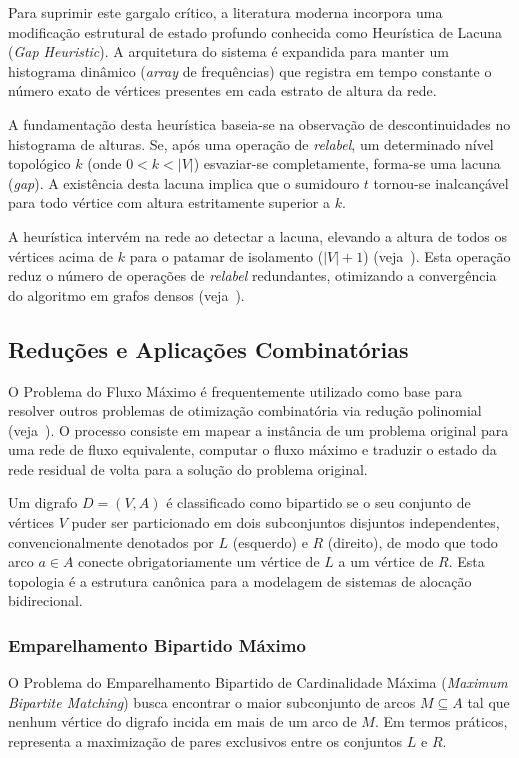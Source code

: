 \documentclass[12pt,a4paper]{article}
\begin{document}
Para suprimir este gargalo crítico, a literatura moderna incorpora uma modificação estrutural de estado profundo conhecida como Heurística de Lacuna (\textit{Gap Heuristic}). A arquitetura do sistema é expandida para manter um histograma dinâmico (\textit{array} de frequências) que registra em tempo constante o número exato de vértices presentes em cada estrato de altura da rede.

A fundamentação desta heurística baseia-se na observação de descontinuidades no histograma de alturas. Se, após uma operação de \textit{relabel}, um determinado nível topológico $k$ (onde $0 < k < |V|$) esvaziar-se completamente, forma-se uma lacuna (\textit{gap}). A existência desta lacuna implica que o sumidouro $t$ tornou-se inalcançável para todo vértice com altura estritamente superior a $k$.

A heurística intervém na rede ao detectar a lacuna, elevando a altura de todos os vértices acima de $k$ para o patamar de isolamento ($|V| + 1$) (veja~\cite{korte2018combinatorial}). Esta operação reduz o número de operações de \textit{relabel} redundantes, otimizando a convergência do algoritmo em grafos densos (veja~\cite{goldberg1988new}).

\subsection{Reduções e Aplicações Combinatórias}
O Problema do Fluxo Máximo é frequentemente utilizado como base para resolver outros problemas de otimização combinatória via redução polinomial (veja~\cite{cook1998combinatorial}). O processo consiste em mapear a instância de um problema original para uma rede de fluxo equivalente, computar o fluxo máximo e traduzir o estado da rede residual de volta para a solução do problema original.

Um digrafo $D = (V, A)$ é classificado como bipartido se o seu conjunto de vértices $V$ puder ser particionado em dois subconjuntos disjuntos independentes, convencionalmente denotados por $L$ (esquerdo) e $R$ (direito), de modo que todo arco $a \in A$ conecte obrigatoriamente um vértice de $L$ a um vértice de $R$. Esta topologia é a estrutura canônica para a modelagem de sistemas de alocação bidirecional.

\subsubsection{Emparelhamento Bipartido Máximo}

O Problema do Emparelhamento Bipartido de Cardinalidade Máxima (\textit{Maximum Bipartite Matching}) busca encontrar o maior subconjunto de arcos $M \subseteq A$ tal que nenhum vértice do digrafo incida em mais de um arco de $M$. Em termos práticos, representa a maximização de pares exclusivos entre os conjuntos $L$ e $R$.
\end{document}
